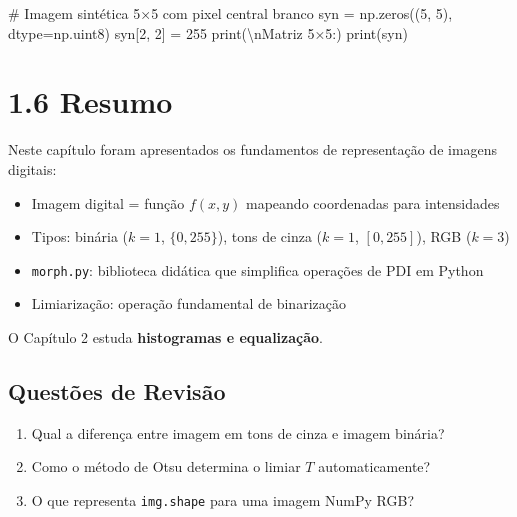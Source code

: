 \documentclass[
  portuguese,
  letterpaper,
  openany,
  oneside,
  12pt,
  a4paper]{book}
\newenvironment{Shaded}{\begin{snugshade}}{\end{snugshade}}
\newcommand{\BuiltInTok}[1]{\textcolor[rgb]{0.00,0.23,0.31}{#1}}
\newcommand{\CharTok}[1]{\textcolor[rgb]{0.13,0.47,0.30}{#1}}
\newcommand{\CommentTok}[1]{\textcolor[rgb]{0.37,0.37,0.37}{#1}}
\newcommand{\DecValTok}[1]{\textcolor[rgb]{0.68,0.00,0.00}{#1}}
\newcommand{\NormalTok}[1]{\textcolor[rgb]{0.00,0.23,0.31}{#1}}
\newcommand{\OperatorTok}[1]{\textcolor[rgb]{0.37,0.37,0.37}{#1}}
\newcommand{\StringTok}[1]{\textcolor[rgb]{0.13,0.47,0.30}{#1}}
\providecommand{\tightlist}{%
  \setlength{\itemsep}{0pt}\setlength{\parskip}{0pt}}
\begin{document}
\begin{tcolorbox}
\begin{Shaded}
\begin{Highlighting}[]
\CommentTok{\# Imagem sintética 5×5 com pixel central branco}
\NormalTok{syn }\OperatorTok{=}\NormalTok{ np.zeros((}\DecValTok{5}\NormalTok{, }\DecValTok{5}\NormalTok{), dtype}\OperatorTok{=}\NormalTok{np.uint8)}
\NormalTok{syn[}\DecValTok{2}\NormalTok{, }\DecValTok{2}\NormalTok{] }\OperatorTok{=} \DecValTok{255}
\BuiltInTok{print}\NormalTok{(}\StringTok{\textquotesingle{}}\CharTok{\textbackslash{}n}\StringTok{Matriz 5×5:\textquotesingle{}}\NormalTok{)}
\BuiltInTok{print}\NormalTok{(syn)}
\end{Highlighting}
\end{Shaded}

\section{1.6 Resumo}\label{resumo-2}

Neste capítulo foram apresentados os fundamentos de representação de
imagens digitais:

\begin{itemize}
\tightlist
\item
  Imagem digital = função \(f(x,y)\) mapeando coordenadas para
  intensidades
\item
  Tipos: binária (\(k=1\), \(\{0,255\}\)), tons de cinza (\(k=1\),
  \([0,255]\)), RGB (\(k=3\))
\item
  \texttt{morph.py}: biblioteca didática que simplifica operações de PDI
  em Python
\item
  Limiarização: operação fundamental de binarização
\end{itemize}

O Capítulo 2 estuda \textbf{histogramas e equalização}.

\subsection{Questões de Revisão}\label{questuxf5es-de-revisuxe3o-1}

\begin{enumerate}
\def\labelenumi{\arabic{enumi}.}
\tightlist
\item
  Qual a diferença entre imagem em tons de cinza e imagem binária?
\item
  Como o método de Otsu determina o limiar \(T\) automaticamente?
\item
  O que representa \texttt{img.shape} para uma imagem NumPy RGB?
\end{enumerate}

\cleardoublepage
{}
{}
\appendix


\end{tcolorbox}
\end{document}

